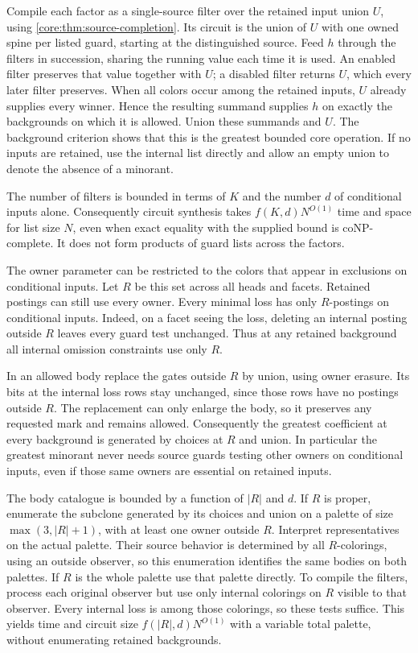 Compile each factor as a single-source filter over
the retained input union $U$, using
\cref{core:thm:source-completion}. Its circuit
is the union of $U$ with one owned spine per
listed guard, starting at the distinguished source.
Feed $h$ through the filters in succession, sharing
the running value each time it is used. An enabled
filter preserves that value together with $U$;
a disabled filter returns $U$, which every later
filter preserves. When all colors occur among
the retained inputs, $U$ already supplies every
winner. Hence the resulting summand supplies $h$
on exactly the backgrounds on which it is allowed.
Union these summands and $U$. The background
criterion shows that this is the greatest bounded
core operation. If no inputs are retained, use
the internal list directly and allow an empty
union to denote the absence of a minorant.

The number of filters is bounded in terms of
$K$ and the number $d$ of conditional inputs alone.
Consequently circuit synthesis takes
$f(K,d)N^{O(1)}$ time and space for list size $N$,
even when
exact equality with the supplied bound is
coNP-complete. It does not form products of
guard lists across the factors.

The owner parameter can be restricted to the
colors that appear in exclusions on conditional
inputs. Let $R$ be this set across all heads and
facets. Retained postings can still use every
owner. Every minimal loss has only $R$-postings
on conditional inputs. Indeed, on a facet seeing
the loss, deleting an internal posting outside
$R$ leaves every guard test unchanged. Thus at
any retained background all internal omission
constraints use only $R$.

In an allowed body replace the gates outside $R$
by union, using owner erasure. Its bits at the
internal loss rows stay unchanged, since those
rows have no postings outside $R$. The replacement
can only enlarge the body, so it preserves any
requested mark and remains allowed. Consequently
the greatest coefficient at every background is
generated by choices at $R$ and union. In
particular the greatest minorant never needs
source guards testing other owners on conditional
inputs, even if those same owners are essential
on retained inputs.

The body catalogue is bounded by a function of
$|R|$ and $d$. If $R$ is proper, enumerate the
subclone generated by its choices and union on
a palette of size $\max(3,|R|+1)$, with at least
one owner outside $R$. Interpret representatives
on the actual palette. Their source behavior is
determined by all $R$-colorings, using an outside
observer, so this enumeration identifies the
same bodies on both palettes. If $R$ is the whole
palette use that palette directly. To compile the
filters, process each original observer but use
only internal colorings on $R$ visible to that
observer. Every internal loss is among those
colorings, so these tests suffice. This yields
time and circuit size $f(|R|,d)N^{O(1)}$ with a
variable total palette, without enumerating
retained backgrounds.

